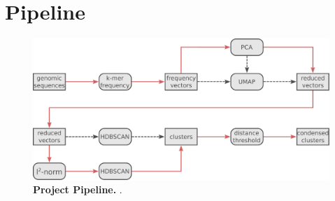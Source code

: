 \section{Pipeline} \label{sec:2.1}

\blindtext

\begin{figure}[!hbt]
    \includegraphics[width=\dimexpr\textwidth-2\fboxsep-2\fboxrule,fbox]{Extra_Graphics/Pipeline_V2.pdf}
    \caption[Project Pipeline]{\textbf{Project Pipeline.} .}
    \label{fig:2.1.1}
\end{figure}
